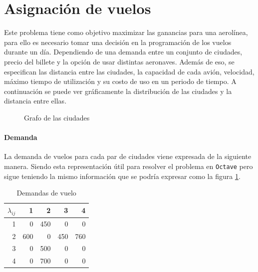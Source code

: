 \documentclass[12pt]{article}
\begin{document}
\section{Asignación de vuelos}

Este problema tiene como objetivo maximizar las ganancias para una aerolínea, para ello es necesario tomar una decisión en la programación de los vuelos durante un día. Dependiendo de una demanda entre un conjunto de ciudades, precio del billete y la opción de usar distintas aeronaves. Además de eso, se especifican las distancia entre las ciudades, la capacidad de cada avión, velocidad, máximo tiempo de utilización y su costo de uso en un periodo de tiempo. A continuación se puede ver gráficamente la distribución de las ciudades y la distancia entre ellas.

\vspace{1em}

\begin{figure}[h]
    \centering
    \caption{Grafo de las ciudades}
    \label{fig:cities}
\end{figure}

\paragraph{Demanda}

La demanda de vuelos para cada par de ciudades viene expresada de la siguiente manera. Siendo esta representación útil para resolver el problema en \texttt{Octave} pero sigue teniendo la mismo información que se podría expresar como la figura \ref{fig:cities}.

\begin{table}[h!]
    \centering
    \begin{tabular}{r|r|r|r|r}
        $\lambda_{ij}$%
               &   1  &   2  &   3  &   4\\
            \hline
            \hline
            1  &   0  & 450  &   0  &   0\\
            2  & 600  &   0  & 450  & 760\\
            3  &   0  & 500  &   0  &   0\\
            4  &   0  & 700  &   0  &   0\\
    \end{tabular}
    \caption{Demandas de vuelo}
    \label{tab:demand}
\end{table}
\end{document}
